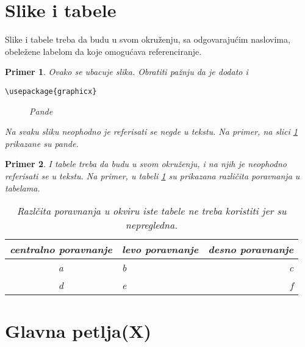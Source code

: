\documentclass[a4paper]{article}
\newtheorem{primer}{Primer}[section]
\begin{document}
{\section{Slike i tabele}
\label{slike_i_tabele}

Slike i tabele treba da budu u svom okruženju, sa odgovarajućim naslovima, obeležene labelom da koje omogućava referenciranje. 

\begin{primer} Ovako se ubacuje slika. Obratiti pažnju da je dodato i 
\begin{verbatim}
\usepackage{graphicx}
\end{verbatim}

\begin{figure}[h!]
\begin{center}
\end{center}
\caption{Pande}
\label{fig:pande}
\end{figure}

Na svaku sliku neophodno je referisati se negde u tekstu. Na primer, na slici \ref{fig:pande} prikazane su pande. 
\end{primer}

\begin{primer} I tabele treba da budu u svom okruženju, i na njih je neophodno referisati se u tekstu. Na primer, u tabeli \ref{tab:tabela1} su prikazana različita poravnanja u tabelama.

\begin{table}[h!]
\begin{center}
\caption{Razlčita poravnanja u okviru iste tabele ne treba koristiti jer su nepregledna.}
\begin{tabular}{|c|l|r|} \hline
centralno poravnanje& levo poravnanje& desno poravnanje\\ \hline
a &b&c\\ \hline
d &e&f\\ \hline
\end{tabular}
\label{tab:tabela1}
\end{center}
\end{table}

\end{primer}





\section{Glavna petlja(X)}
\label{sec:naslov1}


}
\end{document}
